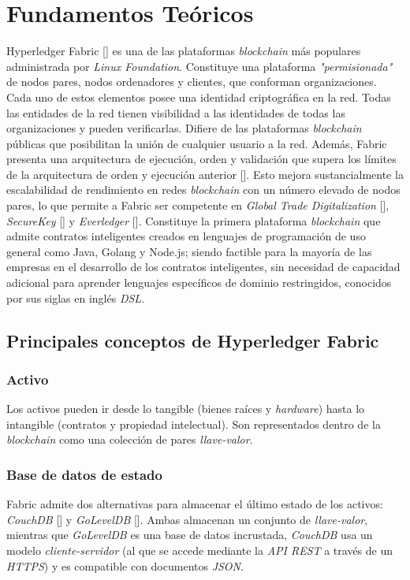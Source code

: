 \chapter{Fundamentos Teóricos}\label{chapter:theoretical_framework}

Hyperledger Fabric [\cite{HF}] es una de las plataformas \emph{blockchain} m\'as populares administrada por \emph{Linux Foundation}. Constituye una plataforma \emph{"permisionada"} de nodos pares, nodos ordenadores y clientes, que conforman organizaciones. Cada uno de estos elementos posee una identidad criptogr\'afica en la red. Todas las entidades de la red tienen visibilidad a las identidades de todas las organizaciones y pueden verificarlas. Difiere de las plataformas \emph{blockchain} p\'ublicas que posibilitan la uni\'on de cualquier usuario a la red. Adem\'as, Fabric presenta una arquitectura de ejecuci\'on, orden y validaci\'on que supera los l\'imites de la arquitectura de orden y ejecuci\'on anterior [\cite{androulaki2018hyperledger}]. Esto mejora sustancialmente la escalabilidad de rendimiento en redes \emph{blockchain} con un n\'umero elevado de nodos pares, lo que permite a Fabric ser competente en \emph{Global Trade Digitalization} [\cite{digitizing-global}], \emph{SecureKey} [\cite{securekey}] y \emph{Everledger} [\cite{everledger}]. Constituye la primera plataforma \emph{blockchain} que admite contratos inteligentes creados en lenguajes de programaci\'on de uso general como Java, Golang y Node.js; siendo factible para la mayor\'ia de las empresas en el desarrollo de los contratos inteligentes, sin necesidad de capacidad adicional para aprender lenguajes espec\'ificos de dominio restringidos, conocidos por sus siglas en ingl\'es \emph{DSL}. 


\section{Principales conceptos de Hyperledger Fabric}

\subsection{Activo}
Los activos pueden ir desde lo tangible (bienes ra\'ices y \emph{hardware}) hasta lo intangible (contratos y propiedad intelectual). Son representados dentro de la \emph{blockchain} como una colecci\'on de pares \emph{llave-valor}.

\subsection{Base de datos de estado}
Fabric admite dos alternativas para almacenar el \'ultimo estado de los activos: \emph{CouchDB} [\cite{CouchDB}] y \emph{GoLevelDB} [\cite{GoLevelDB}]. Ambas almacenan un conjunto de \emph{llave-valor}, mientras que \emph{GoLevelDB} es una base de datos incrustada, \emph{CouchDB} usa un modelo \emph{cliente-servidor} (al que se accede mediante la \emph{API REST} a trav\'es de un \emph{HTTPS}) y es compatible con documentos \emph{JSON}.

